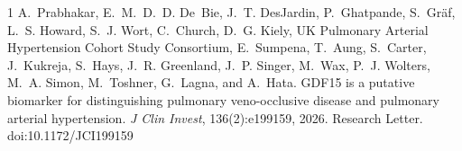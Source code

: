 \documentclass{article}
\begin{document}

\begin{thebibliography}{1}
A.~Prabhakar, E.~M.~D.~D. De~Bie, J.~T. DesJardin, P.~Ghatpande, S.~Gr\"af,
L.~S. Howard, S.~J. Wort, C.~Church, D.~G. Kiely, UK Pulmonary Arterial Hypertension
Cohort Study Consortium, E.~Sumpena, T.~Aung, S.~Carter, J.~Kukreja, S.~Hays,
J.~R. Greenland, J.~P. Singer, M.~Wax, P.~J. Wolters, M.~A. Simon, M.~Toshner,
G.~Lagna, and A.~Hata.
GDF15 is a putative biomarker for distinguishing pulmonary veno-occlusive disease and
pulmonary arterial hypertension.
\emph{J Clin Invest}, 136(2):e199159, 2026. Research Letter. doi:10.1172/JCI199159
\end{thebibliography}
\end{document}
